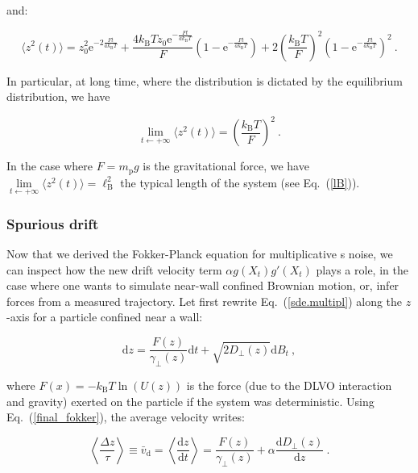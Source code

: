 and:

\begin{equation}
	\langle z^2 (t)\rangle = z_0^2 \mathrm{e}^{-2\frac{Ft}{ak_\mathrm{B}T}} + \frac{4k_\mathrm{B}Tz_0\mathrm{e}^{-\frac{Ft}{ak_\mathrm{B}T}}}{F} \left(1 - \mathrm{e}^{-\frac{Ft}{ak_\mathrm{B}T}}\right) + 2 \left(\frac{ k_\mathrm{B}T}{F}\right)^2\left(1 - \mathrm{e}^{-\frac{Ft}{ak_\mathrm{B}T}}\right)^2 ~.
\end{equation}


In particular, at long time, where the distribution is dictated by the equilibrium distribution, we have 

\begin{equation}
	 \lim\limits_{t\leftarrow+\infty}\langle z^2 (t)\rangle = \left(\frac{k_\mathrm{B}T}{F}\right)^2 ~.
\end{equation}

In the case where $F=m_\mathrm{p}g$ is the gravitational force, we have $ \lim\limits_{t\leftarrow+\infty}\langle z^2 (t)\rangle = \ell_{\mathrm{B}}^2$ the typical length of the system (see Eq.~(\ref{lB})).

\subsubsection{Spurious drift}
\label{sec:spurious}

Now that we derived the Fokker-Planck equation for multiplicative s noise, we can inspect how the new drift velocity term $\alpha g(X_t)g'(X_t)$ plays a role, in the case where one wants to simulate near-wall confined Brownian motion, or, infer forces from a measured trajectory. Let first rewrite Eq.~(\ref{sde.multipl}) along the $z$-axis for a particle confined near a wall:

\begin{equation}
	\mathrm{d}z = \frac{F(z)}{\gamma_\bot (z)} \mathrm{d}t + \sqrt{2 D_\bot(z)}\mathrm{d}B_t ~,
\end{equation}

where $F(x)=-k_\mathrm{B}T \ln (U(z))$ is the force (due to the DLVO interaction and gravity) exerted on the particle if the system was deterministic. Using Eq.~(\ref{final_fokker}), the average velocity writes:

\begin{equation}
	\left\langle \frac{\Delta z}{ \tau} \right\rangle  \equiv \bar{v}_\mathrm{d}
	=\left\langle \frac{\mathrm{d}z}{\mathrm{d}t} \right\rangle = \frac{F(z)}{\gamma_\bot (z)} + \alpha \frac{\mathrm{d} D_\bot(z)}{\mathrm{d}z} ~. 
	\label{drift_alpha}
\end{equation}

